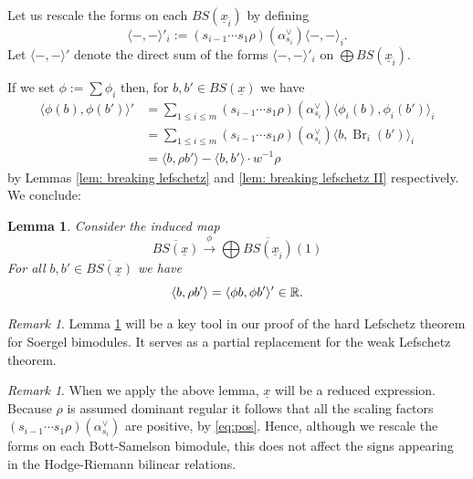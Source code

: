 \documentclass[11pt]{amsart}
\numberwithin{equation}{section}
\def\a{\alpha}
\def\ov{\overline}
\def\un{\underline}
\def\longto{\longrightarrow}
\DeclareMathOperator{\Br}{Br}
\newtheorem{lem}[thm]{Lemma}
\theoremstyle{definition}
\theoremstyle{remark}
\newtheorem{remark}[thm]{Remark}
\begin{document}
{Let us rescale the forms on each $BS(\un{x}_{\widehat{i}})$ by defining
\[
\langle -, - \rangle'_i := ( s_{i-1} \cdots s_1 \rho)(\a_{s_i}^\vee) \langle -, - \rangle_i.
\]
Let $\langle -, - \rangle'$ denote the direct sum of the forms
$\langle -, - \rangle'_i$ on $\bigoplus BS(\un{x}_{\widehat{i}})$.

If we set $\phi := \sum \phi_i$ then, for $b, b' \in BS(\un{x})$
we have
\begin{align*}
  \langle \phi(b), \phi(b') \rangle' & = \sum_{1 \le i \le m} (s_{i-1}
  \cdots s_1 \rho)( \a_{s_i}^\vee) \langle \phi_i(b), \phi_i(b') \rangle_i \\
& = \sum_{1 \le i \le m} ( s_{i-1} \cdots s_1 \rho )(\a_{s_i}^\vee) \langle b, \Br_i(b') \rangle_i \\
& = \langle b, \rho b' \rangle - \langle b, b' \rangle \cdot w^{-1}\rho
\end{align*}
by Lemmas \ref{lem: breaking lefschetz} and \ref{lem: breaking
  lefschetz II} respectively. We conclude:

\begin{lem} \label{lem:factored leftschetz}
  Consider the induced map
\[
\ov{BS(\un{x})} \stackrel{\phi}{\longto} \bigoplus \ov{BS(\un{x}_{\widehat{i}})}(1)
\]
For all $b, b' \in \ov{BS(\un{x})}$ we have
\[
\langle b, \rho b' \rangle = \langle \phi b, \phi b' \rangle' \in {\mathbb{R}}.
\]
\end{lem}

\begin{remark}
  Lemma \ref{lem:factored leftschetz} will be a key tool in our proof
  of the hard Lefschetz theorem for Soergel bimodules. It serves as
  a partial replacement for the weak Lefschetz theorem.
\end{remark}

\begin{remark} When we apply the above lemma, $\un{x}$ will be a
  reduced expression. Because $\rho$ is assumed dominant regular it
  follows that all the scaling factors $(s_{i-1} \cdots s_1
  \rho)(\a_{s_i}^\vee)$ 
are positive, by \eqref{eq:pos}. Hence, although we rescale the forms on each
Bott-Samelson bimodule, this does not affect the signs appearing in the
Hodge-Riemann bilinear relations.
\end{remark}

}
\end{document}
